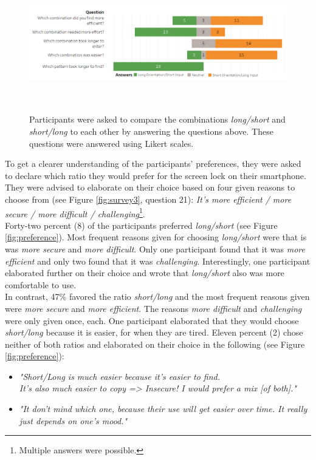 \begin{figure}[t!]
\centering
\includegraphics[width=15cm, height=6cm]{Chapters/graphics/comparison.PNG}
\caption{Participants were asked to compare the combinations \textit{long/short} and \textit{short/long} to each other by answering the questions above. These questions were answered using Likert scales. }
\label{fig:likert2}
\end{figure}

To get a clearer understanding of the participants' preferences, they were asked to declare which ratio they would prefer for the screen lock on their smartphone. They were advised to elaborate on their choice based on four given reasons to choose from (see Figure \ref{fig:survey3}, question 21): \textit{It's more efficient / more secure / more difficult / challenging}\footnote{Multiple answers were possible.}.\\
Forty-two percent (8) of the participants preferred \textit{long/short} (see Figure \ref{fig:preference}). Most frequent reasons given for choosing \textit{long/short} were that is was \textit{more secure} and \textit{more difficult}. Only one participant found that it was \textit{more efficient} and only two found that it was \textit{challenging}. Interestingly, one participant elaborated further on their choice and wrote that \textit{long/short} also was more comfortable to use.\\

In contrast, 47\% favored the ratio \textit{short/long} and the most frequent reasons given were \textit{more secure} and \textit{more efficient}. The reasons \textit{more difficult} and \textit{challenging} were only given once, each. One participant elaborated that they would choose \textit{short/long} because it is easier, for when they are tired. Eleven percent (2) chose neither of both ratios and elaborated on their choice in the following (see Figure \ref{fig:preference}): 
\begin{itemize}
    \item \textit{"Short/Long is much easier because it's easier to find.\\ It's also much easier to copy => Insecure! I would prefer a mix [of both]."}
    \item \textit{"It don't mind which one, because their use will get easier over time. It really just depends on one's mood."} 
\end{itemize}


